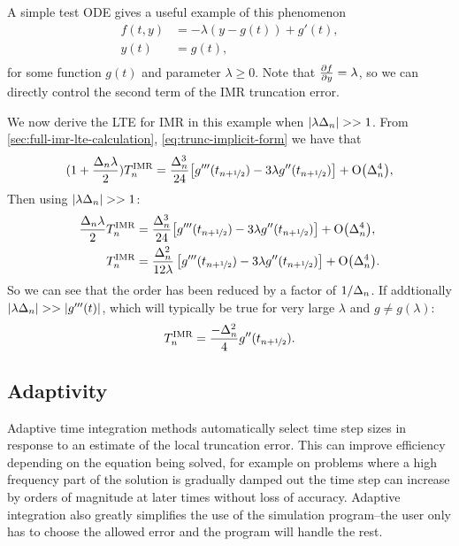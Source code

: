 A simple test ODE gives a useful example of this phenomenon \cite[157]{Atkinson2009}
\begin{equation}
  \label{eqn:imr-test-order-reduction}
  \begin{aligned}
    f(t, y) &= -\lambda (y - g(t)) + g'(t), \\
    y(t) &= g(t), \\
  \end{aligned}
\end{equation}
for some function $g(t)$ and parameter $\lambda \geq 0$.
Note that $\frac{\partial f}{\partial y} = \lambda$, so we can directly control the second term of the IMR truncation error.

We now derive the LTE for IMR in this example when $\left|{\lambda\Delta_{n}} \right| >> 1$.
From \cref{sec:full-imr-lte-calculation}, \cref{eq:trunc-implicit-form} we have that
\begin{equation}
  \begin{aligned}
    (1 + \frac{\Delta_{n} \lambda}{2})T_n^{\text{IMR}} &= \frac{\Delta_{n}^3}{24}
    {\left[ g'''(t_{n+\nicefrac{1}{2}}) - 3 \lambda g''(t_{n+\nicefrac{1}{2}}) \right]} + \text{O}{\left( \Delta_{n}^4 \right)}, \\ 
  \end{aligned}
\end{equation}
Then using $\left|{\lambda\Delta_{n}} \right| >> 1$:
\begin{equation}
  \begin{aligned}
    \frac{\Delta_{n} \lambda}{2} T_n^{\text{IMR}} &= \frac{\Delta_{n}^3}{24}
    {\left[ g'''(t_{n+\nicefrac{1}{2}}) - 3 \lambda g''(t_{n+\nicefrac{1}{2}}) \right]} + \text{O}{\left( \Delta_{n}^4 \right)}, \\ 
    T_n^{\text{IMR}} &= \frac{\Delta_{n}^2}{12\lambda} \left[g'''(t_{n+\nicefrac{1}{2}}) - 3 \lambda g''(t_{n+\nicefrac{1}{2}}) \right] + \text{O}{\left( \Delta_{n}^4 \right)}.
  \end{aligned}
\end{equation}
So we can see that the order has been reduced by a factor of $1/\Delta_{n}$.
If addtionally $\left|{\lambda\Delta_{n}} \right| >> \left|{g'''(t)} \right|$, which will typically be true for very large $\lambda$ and $g \neq g(\lambda)$:
\begin{equation}
  T_n^{\text{IMR}} = \frac{-\Delta_{n}^2}{4} g''(t_{n+\nicefrac{1}{2}}).
  \label{eq:reduced-order-imr-truncation-error}
\end{equation}


\subsection{Adaptivity}
\label{sec:adaptivity}

Adaptive time integration methods automatically select time step sizes in response to an estimate of the local truncation error.
This can improve efficiency depending on the equation being solved, for example on problems where a high frequency part of the solution is gradually damped out the time step can increase by orders of magnitude at later times without loss of accuracy.
Adaptive integration also greatly simplifies the use of the simulation program--the user only has to choose the allowed error and the program will handle the rest.


